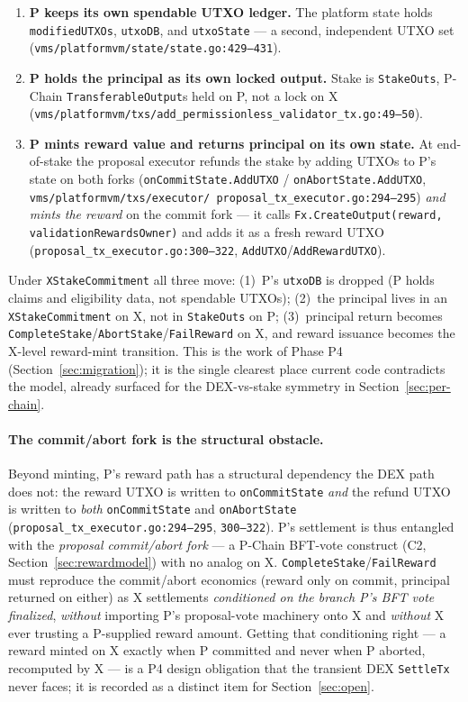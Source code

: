 \begin{enumerate}[leftmargin=2em]
\item \textbf{P keeps its own spendable UTXO ledger.} The platform state
  holds \texttt{modifiedUTXOs}, \texttt{utxoDB}, and \texttt{utxoState}
  --- a second, independent UTXO set
  (\texttt{vms/platformvm/state/state.go:429--431}). \IMPL{}
\item \textbf{P holds the principal as its own locked output.} Stake is
  \texttt{StakeOuts}, P-Chain \texttt{TransferableOutput}s held on P,
  not a lock on X
  (\texttt{vms/platformvm/txs/\allowbreak add\_permissionless\_validator\_tx.go:49--50}).
  \IMPL{}
\item \textbf{P mints reward value and returns principal on its own
  state.} At end-of-stake the proposal executor refunds the stake by
  adding UTXOs to P's state on both forks (\texttt{onCommitState.AddUTXO}
  / \texttt{onAbortState.AddUTXO},
  \texttt{vms/platformvm/txs/executor/\allowbreak
  proposal\_tx\_executor.go:294--295}) \emph{and mints the reward} on the
  commit fork --- it calls
  \texttt{Fx.CreateOutput(reward, validationRewardsOwner)} and adds it as
  a fresh reward UTXO
  (\texttt{proposal\_tx\_executor.go:300--322},
  \texttt{AddUTXO}/\texttt{AddRewardUTXO}). \IMPL{}
\end{enumerate}

\noindent Under \texttt{XStakeCommitment} all three move: (1)~P's
\texttt{utxoDB} is dropped (P holds claims and eligibility data, not
spendable UTXOs); (2)~the principal lives in an \texttt{XStakeCommitment}
on X, not in \texttt{StakeOuts} on P; (3)~principal return becomes
\texttt{CompleteStake}/\texttt{AbortStake}/\texttt{FailReward} on X, and
reward issuance becomes the X-level reward-mint transition. This is the
work of Phase P4 (Section~\ref{sec:migration}); it is the single clearest
place current code contradicts the model, already surfaced for the
DEX-vs-stake symmetry in Section~\ref{sec:per-chain}.

\paragraph{The commit/abort fork is the structural obstacle.} Beyond
minting, P's reward path has a structural dependency the DEX path does
not: the reward UTXO is written to \texttt{onCommitState} \emph{and} the
refund UTXO is written to \emph{both} \texttt{onCommitState} and
\texttt{onAbortState} (\texttt{proposal\_tx\_executor.go:294--295},
\texttt{300--322}). P's settlement is thus entangled with the
\emph{proposal commit/abort fork} --- a P-Chain BFT-vote construct (C2,
Section~\ref{sec:rewardmodel}) with no analog on X.
\texttt{CompleteStake}/\texttt{FailReward} must reproduce the
commit/abort economics (reward only on commit, principal returned on
either) as X settlements \emph{conditioned on the branch P's BFT vote
finalized}, \emph{without} importing P's proposal-vote machinery onto X
and \emph{without} X ever trusting a P-supplied reward amount. Getting
that conditioning right --- a reward minted on X exactly when P committed
and never when P aborted, recomputed by X --- is a P4 design obligation
that the transient DEX \texttt{SettleTx} never faces; it is recorded as a
distinct item for Section~\ref{sec:open}.

